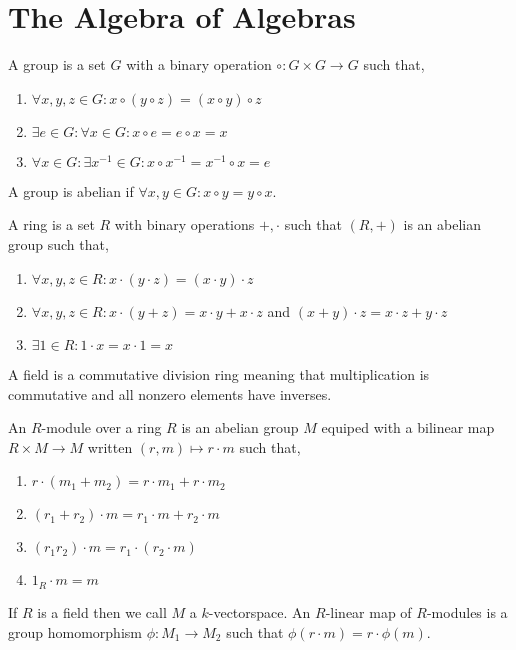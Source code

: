 \documentclass[12pt]{extarticle}
\theoremstyle{definition}
\newenvironment{definition}[1][Definition:]{\begin{trivlist}
\item[\hskip \labelsep {\bfseries #1}]}{\end{trivlist}}
\begin{document}
\section{The Algebra of Algebras}

\iffalse

\begin{definition}
A group is a set $G$ with a binary operation $\circ : G \times G \to G$ such that,
\begin{enumerate}
\item $\forall x,y,z \in G : x \circ (y \circ z) = (x \circ y) \circ z$
\item $\exists e \in G : \forall x \in G : x \circ e = e \circ x = x$
\item $\forall x \in G : \exists x^{-1} \in G : x \circ x^{-1} = x^{-1} \circ x = e$ 
\end{enumerate}
A group is abelian if $\forall x,y \in G: x \circ y = y \circ x$.
\end{definition}

\begin{definition}
A ring is a set $R$ with binary operations $+, \cdot$ such that $(R, +)$ is an abelian group such that,
\begin{enumerate}
\item $\forall x,y,z \in R : x \cdot (y \cdot z) = (x \cdot y) \cdot z$
\item $\forall x,y,z \in R : x \cdot (y + z) = x \cdot y + x \cdot z$  and $(x + y) \cdot z = x \cdot z + y \cdot z$
\item $\exists 1 \in R : 1 \cdot x = x \cdot 1 = x$
\end{enumerate}
\end{definition}

\begin{definition}
A field is a commutative division ring meaning that multiplication is commutative and all nonzero elements have inverses. 
\end{definition}

\begin{definition}
An $R$-module over a ring $R$ is an abelian group $M$ equiped with a bilinear map $R \times M \to M$ written $(r, m) \mapsto r \cdot m$ such that,
\begin{enumerate}
\item $r \cdot (m_1 + m_2) = r \cdot m_1 + r \cdot m_2$
\item $(r_1 + r_2) \cdot m = r_1 \cdot m + r_2 \cdot m$
\item $(r_1 r_2) \cdot m = r_1 \cdot (r_2 \cdot m)$
\item $1_R \cdot m = m$
\end{enumerate}
If $R$ is a field then we call $M$ a $k$-vectorspace. An $R$-linear map of $R$-modules is a group homomorphism $\phi : M_1 \to M_2$ such that $\phi(r \cdot m) = r \cdot \phi(m)$.
\end{definition}
\end{document}

